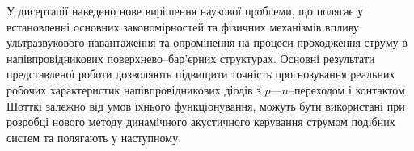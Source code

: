 
У дисертації наведено нове вирішення наукової проблеми, що полягає у встановленні
основних закономірностей та фізичних механізмів впливу ультразвукового навантаження та опромінення на процеси проходження струму в напівпровідникових поверхнево--бар'єрних структурах. Основні результати представленої роботи дозволяють підвищити точність прогнозування реальних робочих характеристик напівпровідникових діодів з $p$---$n$--переходом і контактом Шотткі залежно від умов їхнього функціонування,
можуть бути використані при розробці нового методу динамічного акустичного керування струмом подібних систем та 
полягають у наступному.
